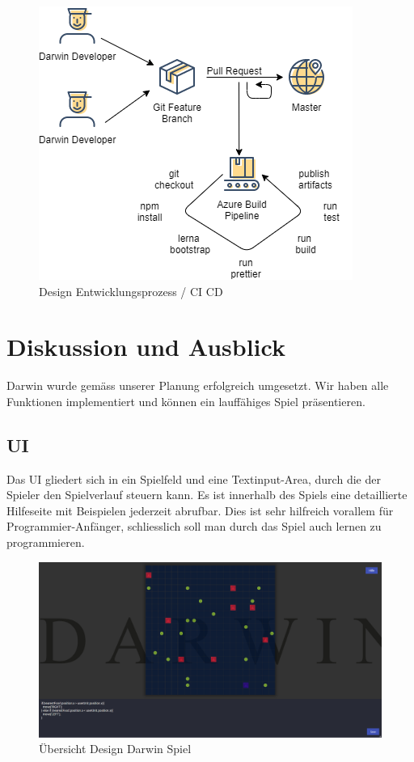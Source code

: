 \documentclass[11pt,a4paper,titlepage]{article}
\begin{document}
\begin{figure}[H]
	\includegraphics{workflow.png}
	\caption{Design Entwicklungsprozess / CI CD}
\end{figure}

\newpage

\section{Diskussion und Ausblick}
%

Darwin wurde gemäss unserer Planung erfolgreich umgesetzt. Wir haben alle Funktionen implementiert und können ein lauffähiges Spiel präsentieren.

\subsection{UI}

Das UI gliedert sich in ein Spielfeld und eine Textinput-Area, durch die der Spieler den Spielverlauf steuern kann. Es ist innerhalb des Spiels eine detaillierte Hilfeseite mit Beispielen jederzeit abrufbar. Dies ist sehr hilfreich vorallem für Programmier-Anfänger, schliesslich soll man durch das Spiel auch lernen zu programmieren.

\begin{figure}[H]
\includegraphics[width=\textwidth]{darwin-gameplay.png}
	\caption{Übersicht Design Darwin Spiel}
\end{figure}
\end{document}
